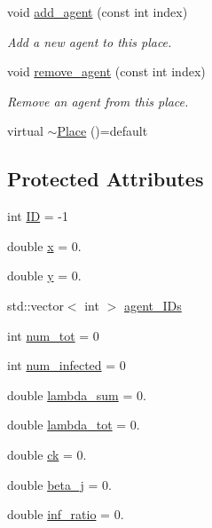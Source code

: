 \begin{DoxyCompactItemize}
void \hyperlink{classPlace_a42d0f8ea98161eb76ebebb4f0946b474}{add\+\_\+agent} (const int index)
\begin{DoxyCompactList}\small\item\em Add a new agent to this place. \end{DoxyCompactList}\item 
void \hyperlink{classPlace_aee19c9f59dcaeb02ac3b1e9c8adaa784}{remove\+\_\+agent} (const int index)
\begin{DoxyCompactList}\small\item\em Remove an agent from this place. \end{DoxyCompactList}\item 
virtual \hyperlink{classPlace_a5dedf984133a4a33a95419da61b54157}{$\sim$\+Place} ()=default
\end{DoxyCompactItemize}
\subsection*{Protected Attributes}
\begin{DoxyCompactItemize}
\item 
int \hyperlink{classPlace_ab8c3da5a85a1901600134ee86f8ab903}{ID} = -\/1
\item 
double \hyperlink{classPlace_ac6d563401f03901268237a3eac6c5a91}{x} = 0.
\item 
double \hyperlink{classPlace_aa2db7a2794804023e6e4b239d2583e26}{y} = 0.
\item 
std\+::vector$<$ int $>$ \hyperlink{classPlace_ace9be66da17210f0d5f0900a7eca9583}{agent\+\_\+\+I\+Ds}
\item 
int \hyperlink{classPlace_a203a593f2d9b7f075936b0dab6aa019f}{num\+\_\+tot} = 0
\item 
int \hyperlink{classPlace_aad8ac414868590db5def58a25266ee7d}{num\+\_\+infected} = 0
\item 
double \hyperlink{classPlace_a8eaee99e4b5cb44399fc331e1555409d}{lambda\+\_\+sum} = 0.
\item 
double \hyperlink{classPlace_a404f9bbc4565b6243ff4efd16e614dfd}{lambda\+\_\+tot} = 0.
\item 
double \hyperlink{classPlace_ac69380b31bba06704bf55945187f1d45}{ck} = 0.
\item 
double \hyperlink{classPlace_a458182cfe5057a826792d65000477f12}{beta\+\_\+j} = 0.
\item 
double \hyperlink{classPlace_af6d1304a203b14b9646ae477841d3073}{inf\+\_\+ratio} = 0.
\end{DoxyCompactItemize}


